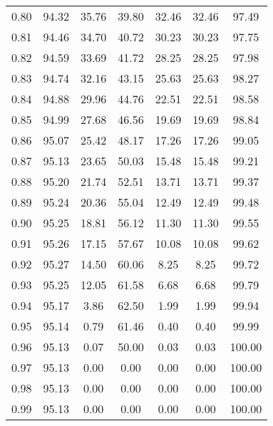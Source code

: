 \begin{tabular}{|c|c|c|c|c|c|c|}
      0.80 &     94.32 &     35.76 &      39.80 &   32.46 &      32.46 &         97.49 \\
      0.81 &     94.46 &     34.70 &      40.72 &   30.23 &      30.23 &         97.75 \\
      0.82 &     94.59 &     33.69 &      41.72 &   28.25 &      28.25 &         97.98 \\
      0.83 &     94.74 &     32.16 &      43.15 &   25.63 &      25.63 &         98.27 \\
      0.84 &     94.88 &     29.96 &      44.76 &   22.51 &      22.51 &         98.58 \\
      0.85 &     94.99 &     27.68 &      46.56 &   19.69 &      19.69 &         98.84 \\
      0.86 &     95.07 &     25.42 &      48.17 &   17.26 &      17.26 &         99.05 \\
      0.87 &     95.13 &     23.65 &      50.03 &   15.48 &      15.48 &         99.21 \\
      0.88 &     95.20 &     21.74 &      52.51 &   13.71 &      13.71 &         99.37 \\
      0.89 &     95.24 &     20.36 &      55.04 &   12.49 &      12.49 &         99.48 \\
      0.90 &     95.25 &     18.81 &      56.12 &   11.30 &      11.30 &         99.55 \\
      0.91 &     95.26 &     17.15 &      57.67 &   10.08 &      10.08 &         99.62 \\
      0.92 &     95.27 &     14.50 &      60.06 &    8.25 &       8.25 &         99.72 \\
      0.93 &     95.25 &     12.05 &      61.58 &    6.68 &       6.68 &         99.79 \\
      0.94 &     95.17 &      3.86 &      62.50 &    1.99 &       1.99 &         99.94 \\
      0.95 &     95.14 &      0.79 &      61.46 &    0.40 &       0.40 &         99.99 \\
      0.96 &     95.13 &      0.07 &      50.00 &    0.03 &       0.03 &        100.00 \\
      0.97 &     95.13 &      0.00 &       0.00 &    0.00 &       0.00 &        100.00 \\
      0.98 &     95.13 &      0.00 &       0.00 &    0.00 &       0.00 &        100.00 \\
      0.99 &     95.13 &      0.00 &       0.00 &    0.00 &       0.00 &        100.00 \\
\bottomrule
\end{tabular}
